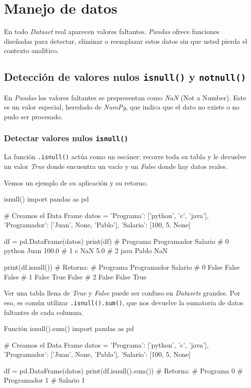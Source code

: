 \section{Manejo de datos}

En todo \textit{Dataset} real aparecen valores faltantes. \textit{Pandas} ofrece funciones diseñadas para detectar, eliminar o reemplazar estos datos sin que usted pierda el contexto analítico.

\subsection{Detección de valores nulos \texttt{isnull()} y \texttt{notnull()}}

En \textit{Pandas} los valores faltantes se prepresentan como \textit{NaN} (Not a Number). Este es un valor especial, heredado de \textit{NumPy}, que indica que el dato no existe o no pudo ser procesado.

\subsubsection{Detectar valores nulos \texttt{isnull()}}

La función \texttt{.isnull()} actúa como un escáner: recorre toda su tabla y le devuelve un valor \textit{True} donde encuentra un vacío y un \textit{False} donde hay datos reales.

Vemos un ejemplo de su aplicación y su retorno.
\begin{pycode}{isnull()}
import pandas as pd

# Creamos el Data Frame
datos = {
    'Programa': ['python', 'c', 'java'],
    'Programador': ['Juan', None, 'Pablo'],
    'Salario': [100, 5, None]
}    

df = pd.DataFrame(datos)
print(df)
#   Programa Programador  Salario
# 0   python        Juan    100.0
# 1        c         NaN      5.0
# 2     java       Pablo      NaN

print(df.isnull()) # Retorna:
#    Programa  Programador  Salario
# 0     False        False    False
# 1     False         True    False
# 2     False        False     True
\end{pycode}

Ver una tabla llena de \textit{True} y \textit{False} puede ser confuso en \textit{Datasets} grandes. Por eso, es común utilizar \texttt{.isnull().sum()}, que nos devuelve la sumatoria de datos faltantes de cada columna.

\begin{pycode}{Función isnull().sum()}
import pandas as pd

# Creamos el Data Frame
datos = {
    'Programa': ['python', 'c', 'java'],
    'Programador': ['Juan', None, 'Pablo'],
    'Salario': [100, 5, None]
}    

df = pd.DataFrame(datos)
print(df.isnull().sum()) # Retorna:
# Programa       0
# Programador    1
# Salario        1
\end{pycode}

